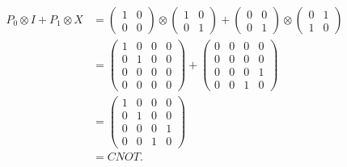 \documentclass[10pt]{article}
\begin{document}
\begin{align*}
P_0 \otimes I + P_1 \otimes X &= 
\begin{pmatrix}
1 & 0 \\
0 & 0
\end{pmatrix}
\otimes 
\begin{pmatrix}
1 & 0 \\
0 & 1
\end{pmatrix}
+ 
\begin{pmatrix}
0 & 0 \\
0 & 1
\end{pmatrix}
\otimes
\begin{pmatrix}
0 & 1 \\
1 & 0
\end{pmatrix} \\
&= 
\begin{pmatrix}
1 & 0 & 0 & 0 \\
0 & 1 & 0 & 0 \\
0 & 0 & 0 & 0 \\
0 & 0 & 0 & 0 
\end{pmatrix}
+
\begin{pmatrix}
0 & 0 & 0 & 0 \\
0 & 0 & 0 & 0 \\
0 & 0 & 0 & 1 \\
0 & 0 & 1 & 0 
\end{pmatrix} \\
&= 
\begin{pmatrix}
1 & 0 & 0 & 0 \\
0 & 1 & 0 & 0 \\
0 & 0 & 0 & 1 \\
0 & 0 & 1 & 0 
\end{pmatrix} \\
&= CNOT.
\end{align*}
\end{document}
